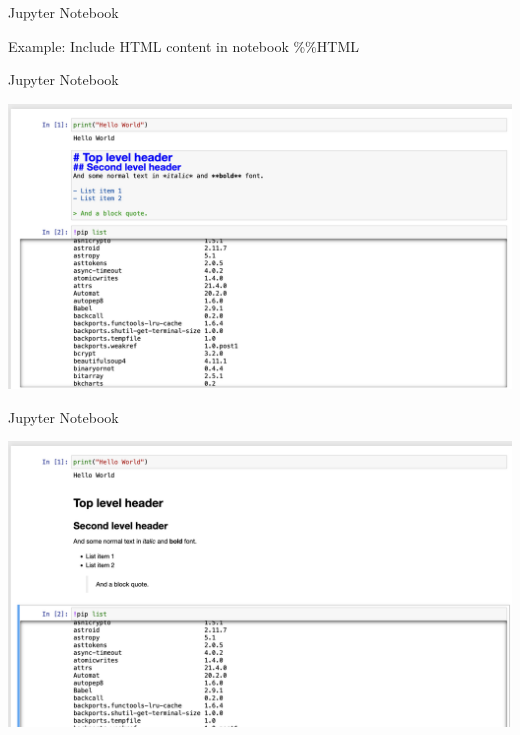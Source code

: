 \documentclass[10pt, aspectratio=169]{beamer}
\begin{document}
{\begin{frame}{Jupyter Notebook}
    \begin{block}{Example: Include HTML content in notebook}
        \%\%HTML
    \end{block}
    
\end{frame}

\begin{frame}{Jupyter Notebook}

   \begin{center}
       \includegraphics[scale=0.3]{Day 1/Slides/LaTeX files/Notebook2.png}
   \end{center}
    
\end{frame}

\begin{frame}{Jupyter Notebook}

   \begin{center}
       \includegraphics[scale=0.3]{Day 1/Slides/LaTeX files/Notebook3.png}
   \end{center}
    
\end{frame}

}
\end{document}
